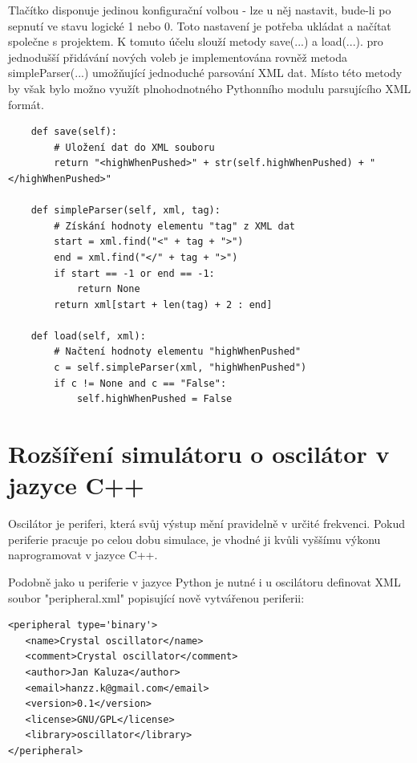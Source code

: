 Tlačítko disponuje jedinou konfigurační volbou - lze u něj nastavit, bude-li po sepnutí ve stavu logické 1 nebo 0. Toto nastavení je potřeba ukládat a načítat společne s projektem. K tomuto účelu slouží metody save(...) a load(...). pro jednodušší přidávání nových voleb je implementována rovněž metoda simpleParser(...) umožňující jednoduché parsování XML dat. Místo této metody by však bylo možno využít plnohodnotného Pythonního modulu parsujícího XML formát.
\begin{lstlisting}
	def save(self):
		# Uložení dat do XML souboru
		return "<highWhenPushed>" + str(self.highWhenPushed) + "</highWhenPushed>"

	def simpleParser(self, xml, tag):
		# Získání hodnoty elementu "tag" z XML dat
		start = xml.find("<" + tag + ">")
		end = xml.find("</" + tag + ">")
		if start == -1 or end == -1:
			return None
		return xml[start + len(tag) + 2 : end]

	def load(self, xml):
		# Načtení hodnoty elementu "highWhenPushed"
		c = self.simpleParser(xml, "highWhenPushed")
		if c != None and c == "False":
			self.highWhenPushed = False
\end{lstlisting}

\section{Rozšíření simulátoru o oscilátor v jazyce C++}
\label{oscilator}

Oscilátor je periferi, která svůj výstup mění pravidelně v určité frekvenci. Pokud periferie pracuje po celou dobu simulace, je vhodné ji kvůli vyššímu výkonu naprogramovat v jazyce C++.

Podobně jako u periferie v jazyce Python je nutné i u oscilátoru definovat XML soubor "peripheral.xml" popisující nově vytvářenou periferii:

\lstset{language=XML, numbers=left, frame=single, breaklines=true, tabsize=2, xleftmargin=20pt}
\begin{lstlisting}
<peripheral type='binary'>
   <name>Crystal oscillator</name>
   <comment>Crystal oscillator</comment>
   <author>Jan Kaluza</author>
   <email>hanzz.k@gmail.com</email>
   <version>0.1</version>
   <license>GNU/GPL</license>
   <library>oscillator</library>
</peripheral>
\end{lstlisting}


